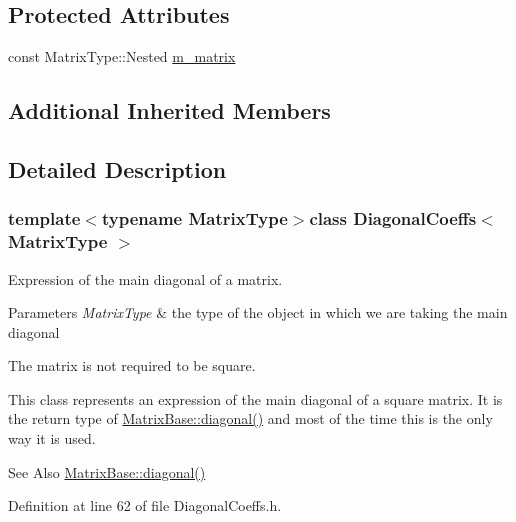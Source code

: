 \subsection*{Protected Attributes}
\begin{DoxyCompactItemize}
\item 
const Matrix\-Type\-::\-Nested \hyperlink{class_diagonal_coeffs_ad63500614069b5e66525a62b66b8ae7b}{m\-\_\-matrix}
\end{DoxyCompactItemize}
\subsection*{Additional Inherited Members}


\subsection{Detailed Description}
\subsubsection*{template$<$typename Matrix\-Type$>$class Diagonal\-Coeffs$<$ Matrix\-Type $>$}

Expression of the main diagonal of a matrix. 


\begin{DoxyParams}{Parameters}
{\em Matrix\-Type} & the type of the object in which we are taking the main diagonal\\
\hline
\end{DoxyParams}
The matrix is not required to be square.

This class represents an expression of the main diagonal of a square matrix. It is the return type of \hyperlink{class_matrix_base_a75bd6c829a7db9a2e9071b5e5e520847}{Matrix\-Base\-::diagonal()} and most of the time this is the only way it is used.

\begin{DoxySeeAlso}{See Also}
\hyperlink{class_matrix_base_a75bd6c829a7db9a2e9071b5e5e520847}{Matrix\-Base\-::diagonal()} 
\end{DoxySeeAlso}


Definition at line 62 of file Diagonal\-Coeffs.\-h.



